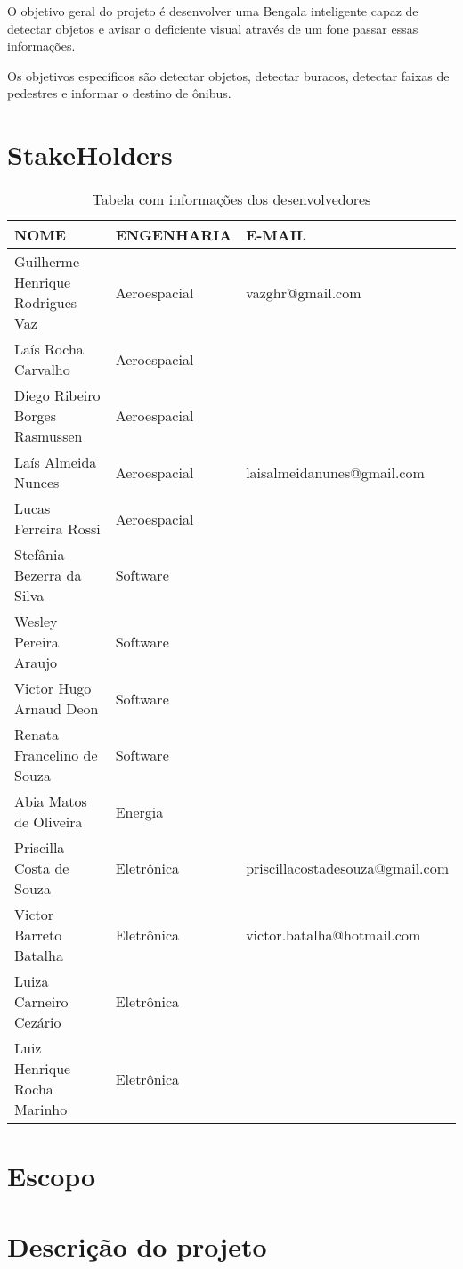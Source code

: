 	O objetivo geral do projeto é desenvolver uma Bengala inteligente capaz de detectar objetos e avisar o deficiente visual através de um fone passar essas informações. 
	
	Os objetivos específicos são detectar objetos, detectar buracos, detectar faixas de pedestres e  informar o destino de ônibus.

\section{StakeHolders}

\begin{table}[h]
	\centering
	\label{tab01}
	\caption{Tabela com informações dos desenvolvedores}
	\begin{tabular}{p{6.5cm}|p{3.2cm} | p{5cm}}
		\toprule
		\textbf{NOME} & \textbf{ENGENHARIA} & \textbf{E-MAIL}\\ \hline
        Guilherme Henrique Rodrigues Vaz & Aeroespacial  & vazghr@gmail.com\\ \hline
          Laís Rocha Carvalho   &  Aeroespacial &  \\ \hline
          Diego Ribeiro Borges Rasmussen & Aeroespacial   &  \\ \hline
         Laís Almeida Nunces & Aeroespacial & laisalmeidanunes@gmail.com \\ \hline
         Lucas Ferreira Rossi & Aeroespacial &  \\ \hline
         Stefânia Bezerra da Silva & Software & \\ \hline
         Wesley Pereira Araujo & Software & \\ \hline
         Victor Hugo Arnaud Deon & Software &  \\ \hline
         Renata Francelino de Souza & Software &  \\ \hline
         Abia Matos de Oliveira & Energia & \\ \hline
         Priscilla Costa de Souza & Eletrônica & priscillacostadesouza@gmail.com\\ \hline
         Victor Barreto Batalha & Eletrônica & victor.batalha@hotmail.com\\ \hline
         Luiza Carneiro Cezário & Eletrônica & \\ \hline
         Luiz Henrique Rocha Marinho & Eletrônica &\\ \hline
		\bottomrule
		
	\end{tabular}
\end{table}


\section{Escopo}

\section{Descrição do projeto}
